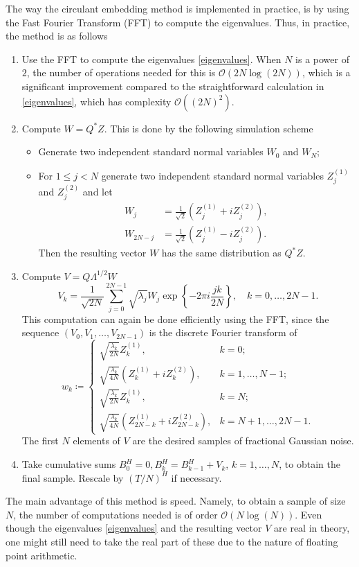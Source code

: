 The way the circulant embedding method is implemented in practice, is by using the Fast Fourier Transform (FFT) to compute the eigenvalues. Thus, in practice, the method is as follows
\begin{enumerate}
    \item Use the FFT to compute the eigenvalues \eqref{eigenvalues}. When $N$ is a power of $2$, the number of operations needed for this is $\mathcal{O}(2N\log(2N))$, which is a significant improvement compared to the straightforward calculation in \eqref{eigenvalues}, which has complexity $\mathcal{O}((2N)^2)$.
    \item Compute $W=Q^{*}Z$. This is done by the following simulation scheme
    \begin{itemize}
        \item Generate two independent standard normal variables $W_0$ and $W_N$;
        \item For $1\leq j<N$ generate two independent standard normal variables $Z^{(1)}_{j}$ and $Z^{(2)}_{j}$ and let
        \begin{align*}
            W_{j}&=\frac{1}{\sqrt{2}}\left(Z^{(1)}_{j}+iZ^{(2)}_{j}\right),\\
            W_{2N-j}&=\frac{1}{\sqrt{2}}\left(Z^{(1)}_{j}-iZ^{(2)}_{j}\right).
        \end{align*}
        Then the resulting vector $W$ has the same distribution as $Q^{*}Z$.
    \end{itemize}
    \item Compute $V=Q\Lambda^{1/2}W$
    \begin{equation}
        V_{k}=\frac{1}{\sqrt{2N}}\sum_{j=0}^{2N-1}\sqrt{\lambda_{j}}W_{j}\exp\left\{-2\pi i\frac{jk}{2N}\right\},\quad k=0,\dots,2N-1.
    \end{equation}
    This computation can again be done efficiently using the FFT, since the sequence $(V_{0},V_{1},\dots,V_{2N-1})$ is the discrete Fourier transform of 
    \begin{equation}
        w_{k}\coloneqq\begin{cases}
\sqrt{\frac{\lambda_{k}}{2N}}Z_{k}^{(1)}, & k=0;\\
\sqrt{\frac{\lambda_{k}}{4N}}\left(Z_{k}^{(1)}+iZ_{k}^{(2)}\right), & k=1,\dots,N-1;\\
\sqrt{\frac{\lambda_{k}}{2N}}Z_{k}^{(1)}, & k=N;\\
\sqrt{\frac{\lambda_{k}}{4N}}\left(Z_{2N-k}^{(1)}+iZ_{2N-k}^{(2)}\right), & k=N+1,\dots,2N-1.
        \end{cases}
    \end{equation}
The first $N$ elements of $V$ are the desired samples of fractional Gaussian noise.
\item Take cumulative sums $B_{0}^{H}=0, B_{k}^{H}=B_{k-1}^{H}+V_{k}$, $k=1,\dots,N$, to obtain the final sample. Rescale by $(T/N)^{H}$ if necessary. 
\end{enumerate}
The main advantage of this method is speed. Namely, to obtain a sample of size $N$, the number of computations needed is of order $\mathcal{O}(N\log(N))$. Even though the eigenvalues \eqref{eigenvalues} and the resulting vector $V$ are real in theory, one might still need to take the real part of these due to the nature of floating point arithmetic.

